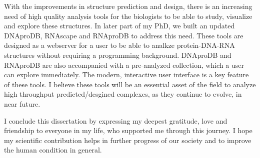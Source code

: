 With the improvements in structure prediction and design, there is an increasing need of high quality analysis tools for the biologists to be able to study, visualize and explore these structures. In later part of my PhD, we built an updated DNAproDB, RNAscape \citep{Mitra2024rnascape} and RNAproDB to address this need. These tools are designed as a webserver for a user to be able to analkze protein-DNA-RNA structures without requiring a programming background. DNAproDB and RNAproDB are also accompanied with a pre-analyzed collection, which a user can explore immediately. The modern, interactive user interface is a key feature of these tools. I believe these tools will be an essential asset of the field to analyze high throughput predicted/desgined complexes, as they continue to evolve, in near future. 

I conclude this dissertation by expressing my deepest gratitude, love and friendship to everyone in my life, who supported me through this journey. I hope my scientific contribution helps in further progress of our society and to improve the human condition in general.
